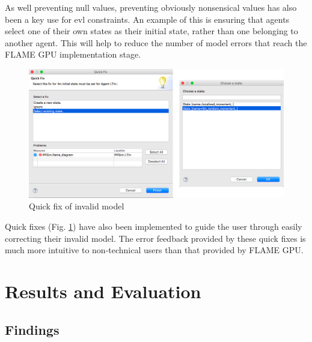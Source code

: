 \documentclass{UoYCSproject}
\begin{document}
As well preventing null values, preventing obviously nonsensical values has also been a key use for \gls{evl} constraints.
An example of this is ensuring that agents select one of their own states as their initial state, rather than one belonging to another agent.
This will help to reduce the number of model errors that reach the \gls{FLAME GPU} implementation stage.


\begin{figure}[htp]
\centering
\includegraphics[width=\textwidth]{Appendix/validation_quickfix_gmf}
\caption{Quick fix of invalid model}
\label{fig:validation_quickfix_gmf}
\end{figure}

Quick fixes (Fig. \ref{fig:validation_quickfix_gmf}) have also been implemented to guide the user through easily correcting their invalid model.
The error feedback provided by these quick fixes is much more intuitive to non-technical users than that provided by \gls{FLAME GPU}.



\chapter{Results and Evaluation}
\label{results}


\section{Findings}
\end{document}
